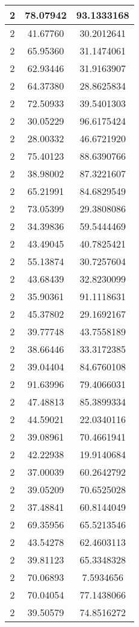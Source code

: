 \documentclass[
]{book}
\begin{document}
\begin{tabular}{c|c|c}
\hline
2 & 78.07942 & 93.1333168\\
\hline
2 & 41.67760 & 30.2012641\\
\hline
2 & 65.95360 & 31.1474061\\
\hline
2 & 62.93446 & 31.9163907\\
\hline
2 & 64.37380 & 28.8625834\\
\hline
2 & 72.50933 & 39.5401303\\
\hline
2 & 30.05229 & 96.6175424\\
\hline
2 & 28.00332 & 46.6721920\\
\hline
2 & 75.40123 & 88.6390766\\
\hline
2 & 38.98002 & 87.3221607\\
\hline
2 & 65.21991 & 84.6829549\\
\hline
2 & 73.05399 & 29.3808086\\
\hline
2 & 34.39836 & 59.5444469\\
\hline
2 & 43.49045 & 40.7825421\\
\hline
2 & 55.13874 & 30.7257604\\
\hline
2 & 43.68439 & 32.8230099\\
\hline
2 & 35.90361 & 91.1118631\\
\hline
2 & 45.37802 & 29.1692167\\
\hline
2 & 39.77748 & 43.7558189\\
\hline
2 & 38.66446 & 33.3172385\\
\hline
2 & 39.04404 & 84.6760108\\
\hline
2 & 91.63996 & 79.4066031\\
\hline
2 & 47.48813 & 85.3899334\\
\hline
2 & 44.59021 & 22.0340116\\
\hline
2 & 39.08961 & 70.4661941\\
\hline
2 & 42.22938 & 19.9140684\\
\hline
2 & 37.00039 & 60.2642792\\
\hline
2 & 39.05209 & 70.6525028\\
\hline
2 & 37.48841 & 60.8144049\\
\hline
2 & 69.35956 & 65.5213546\\
\hline
2 & 43.54278 & 62.4603113\\
\hline
2 & 39.81123 & 65.3348328\\
\hline
2 & 70.06893 & 7.5934656\\
\hline
2 & 70.04054 & 77.1438066\\
\hline
2 & 39.50579 & 74.8516272\\

\end{tabular}
\end{document}
